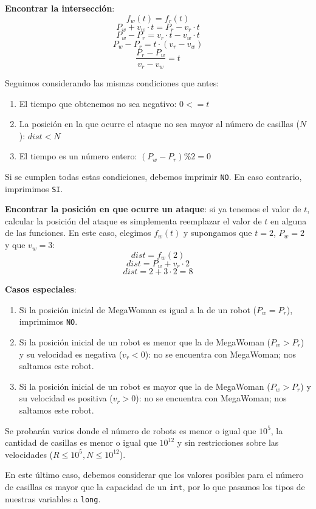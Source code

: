 \documentclass{oci}
\begin{document}
\begin{scoreDescription}
  \textbf{Encontrar la intersecci\'on}:
  $$ f_w(t) = f_r(t) $$
  $$ P_w + v_w \cdot t = P_r - v_r \cdot t $$
  $$ P_w - P_r =  v_r \cdot t - v_w \cdot t $$
  $$ P_w - P_r =  t \cdot (v_r - v_w) $$
  $$ \frac{P_r - P_w}{v_r - v_w} =  t $$

  Seguimos considerando las mismas condiciones que antes:
  \begin{enumerate}
    \item El tiempo que obtenemos no sea negativo: $0 <= t$
    \item La posici\'on en la que ocurre el ataque no sea 
    mayor al n\'umero de casillas ($N$): $dist < N $
    \item El tiempo es un n\'umero entero: $ (P_w - P_r) \% 2 = 0$
  \end{enumerate}

  Si se cumplen todas estas condiciones, debemos imprimir \texttt{NO}. 
  En caso contrario, imprimimos \texttt{SI}.

  \textbf{Encontrar la posici\'on  en que ocurre un ataque}: si ya tenemos el valor
  de $t$, calcular la posici\'on del ataque es simplementa reemplazar el valor de $t$
  en alguna de las funciones. En este caso, elegimos $f_w(t)$ y supongamos que $t = 2$,
  $P_w = 2$ y que $v_w = 3$:
  $$dist = f_w(2)$$
  $$dist = P_w + v_r \cdot 2$$
  $$dist = 2 + 3 \cdot 2 = 8$$

  \textbf{Casos especiales}:
  \begin{enumerate}
    \item Si la posici\'on inicial de MegaWoman es igual a la de un robot ($P_w = P_r$), imprimimos \texttt{NO}.
    \item Si la posici\'on inicial de un robot es menor que la de MegaWoman ($P_w > P_r$) y su
    velocidad es negativa ($v_r < 0$): no se encuentra con MegaWoman; nos saltamos este robot.
    \item Si la posici\'on inicial de un robot es mayor que la de MegaWoman ($P_w > P_r$) y su
    velocidad es positiva ($v_r > 0$): no se encuentra con MegaWoman; nos saltamos este robot.
  \end{enumerate}

  \noindent\makebox[\linewidth]{\rule{\paperwidth}{0.2pt}}

   Se probarán varios donde el número de robots es menor o igual que
  $10^5$, la cantidad de casillas es menor o igual que $10^{12}$ y sin
  restricciones sobre las velocidades ($R\leq 10^5, N \leq10^{12}$).

  En este \'ultimo caso, debemos considerar que los valores posibles para el n\'umero de
  casillas es mayor que la capacidad de un \texttt{int}, por lo que pasamos los tipos
  de nuestras variables a \texttt{long}.
\end{scoreDescription}
\end{document}
